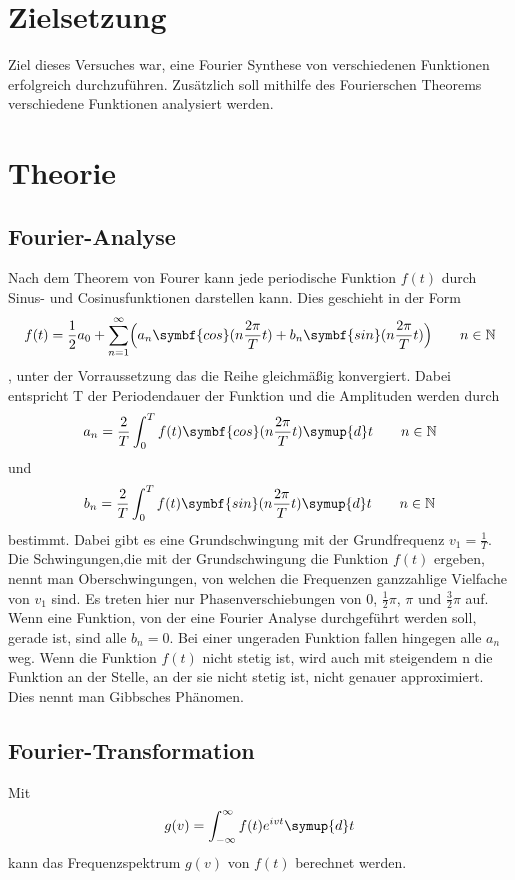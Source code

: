 \section{Zielsetzung}
\label{sec:Zielsetzung}
Ziel dieses Versuches war, eine Fourier Synthese von verschiedenen Funktionen erfolgreich durchzuführen.
Zusätzlich soll mithilfe des Fourierschen Theorems verschiedene Funktionen analysiert werden.

\section{Theorie}
\label{sec:Theorie}
\subsection{Fourier-Analyse}
Nach dem Theorem von Fourer kann jede periodische Funktion $f(t)$ durch Sinus- und Cosinusfunktionen darstellen kann.
Dies geschieht in der Form 
\begin{equation}
    f(t)=\frac{1}{2}a_0+\sum_{n=1}^{\infty}\Bigl(a_n \symbf{cos}(n \frac{2 \pi}{T} t) + b_n \symbf{sin}(n \frac{2\pi}{T}t)\Bigr) \qquad n\in\mathbb{N}
    \label{eqn:f_reihe}
\end{equation}, unter der Vorraussetzung das die Reihe gleichmäßig konvergiert.
Dabei entspricht T der Periodendauer der Funktion und die Amplituden werden durch
\begin{equation}
    a_n=\frac{2}{T}\int_0^T f(t) \symbf{cos}(n \frac{2\pi}{T}t) \symup{d}t \qquad n\in\mathbb{N}
    \label{eqn:a_n}
\end{equation}
und 
\begin{equation}
    b_n=\frac{2}{T}\int_0^T f(t) \symbf{sin}(n \frac{2\pi}{T}t) \symup{d}t \qquad n\in\mathbb{N}
    \label{eqn:b_n}
\end{equation}
bestimmt.
Dabei gibt es eine Grundschwingung mit der Grundfrequenz $v_1=\frac{1}{T}$.
Die Schwingungen,die mit der Grundschwingung die Funktion $f(t)$ ergeben, nennt man Oberschwingungen, von welchen die Frequenzen ganzzahlige Vielfache von $v_1$ sind.
Es treten hier nur Phasenverschiebungen von 0, $\frac{1}{2}\pi$, $\pi$ und $\frac{3}{2}\pi$ auf.
Wenn eine Funktion, von der eine Fourier Analyse durchgeführt werden soll, gerade ist, sind alle $b_n=0$.
Bei einer ungeraden Funktion fallen hingegen alle $a_n$ weg.
Wenn die Funktion $f(t)$ nicht stetig ist, wird auch mit steigendem n die Funktion an der Stelle, an der sie nicht stetig ist, nicht genauer approximiert.
Dies nennt man Gibbsches Phänomen.

\subsection{Fourier-Transformation}
Mit
\begin{equation*}
    g(v)=\int_{-\infty}^{\infty} f(t) e^{ivt} \symup{d}t
    \label{eqn:trafo}
\end{equation*}
kann das Frequenzspektrum $g(v)$ von $f(t)$ berechnet werden.%
\cite{V351}
